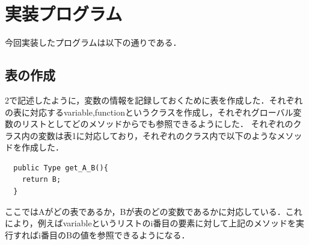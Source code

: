 \documentclass[dvipdfmx]{jarticle}
\begin{document}
\section{実装プログラム}
今回実装したプログラムは以下の通りである．
\subsection{表の作成}
2で記述したように，変数の情報を記録しておくために表を作成した．それぞれの表に対応するvariable,functionというクラスを作成し，それぞれグローバル変数のリストとしてどのメソッドからでも参照できるようにした．
それぞれのクラス内の変数は表1に対応しており，それぞれのクラス内で以下のようなメソッドを作成した．
\begin{lstlisting}
  public Type get_A_B(){
    return B;
  }
\end{lstlisting}
ここではAがどの表であるか，Bが表のどの変数であるかに対応している．これにより，例えばvariableというリストのi番目の要素に対して上記のメソッドを実行すればi番目のBの値を参照できるようになる．
\end{document}
